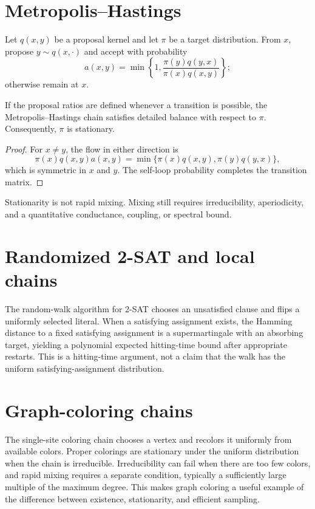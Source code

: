 \section{Metropolis--Hastings}

Let $q(x,y)$ be a proposal kernel and let $\pi$ be a target distribution.
From $x$, propose $y\sim q(x,\cdot)$ and accept with probability
\[
 a(x,y)=\min\left\{1,\frac{\pi(y)q(y,x)}{\pi(x)q(x,y)}\right\};
\]
otherwise remain at $x$.

\begin{theorem}
If the proposal ratios are defined whenever a transition is possible, the
Metropolis--Hastings chain satisfies detailed balance with respect to $\pi$.
Consequently, $\pi$ is stationary.
\end{theorem}

\begin{proof}
For $x\neq y$, the flow in either direction is
\[
 \pi(x)q(x,y)a(x,y)
 =\min\{\pi(x)q(x,y),\pi(y)q(y,x)\},
\]
which is symmetric in $x$ and $y$.  The self-loop probability completes the
transition matrix.
\end{proof}

Stationarity is not rapid mixing.  Mixing still requires irreducibility,
aperiodicity, and a quantitative conductance, coupling, or spectral bound.

\section{Randomized 2-SAT and local chains}

The random-walk algorithm for 2-SAT chooses an unsatisfied clause and flips a
uniformly selected literal.  When a satisfying assignment exists, the Hamming
distance to a fixed satisfying assignment is a supermartingale with an
absorbing target, yielding a polynomial expected hitting-time bound after
appropriate restarts.  This is a hitting-time argument, not a claim that the
walk has the uniform satisfying-assignment distribution.

\section{Graph-coloring chains}

The single-site coloring chain chooses a vertex and recolors it uniformly
from available colors.  Proper colorings are stationary under the uniform
distribution when the chain is irreducible.  Irreducibility can fail when
there are too few colors, and rapid mixing requires a separate condition,
typically a sufficiently large multiple of the maximum degree.  This makes
graph coloring a useful example of the difference between existence,
stationarity, and efficient sampling.

